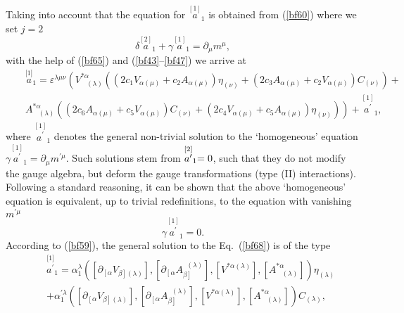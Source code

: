 \documentclass[a4paper,11pt]{article}
\begin{document}
Taking into account that the equation for $\stackrel{[1]}{a}_{1}$ is
obtained from (\ref{bf60}) where we set $j=2$%
\begin{equation}
\delta \stackrel{[2]}{a}_{1}+\gamma \stackrel{[1]}{a}_{1}=\partial _{\mu
}m^{\mu },  \label{bf66}
\end{equation}
with the help of (\ref{bf65}) and (\ref{bf43}--\ref{bf47}) we arrive at
\begin{eqnarray}
&&\stackrel{\lbrack 1]}{a}_{1}=\varepsilon ^{\lambda \mu \nu }\left(
V_{\;\;\;(\lambda )}^{*\alpha }\left( \left( 2c_{1}V_{\alpha (\mu
)}+c_{2}A_{\alpha (\mu )}\right) \eta _{(\nu )}+\left( 2c_{3}A_{\alpha (\mu
)}+c_{2}V_{\alpha (\mu )}\right) C_{(\nu )}\right) +\right.  \nonumber \\
&&\left. A_{\;\;\;(\lambda )}^{*\alpha }\left( \left( 2c_{6}A_{\alpha (\mu
)}+c_{5}V_{\alpha (\mu )}\right) C_{(\nu )}+\left( 2c_{4}V_{\alpha (\mu
)}+c_{5}A_{\alpha (\mu )}\right) \eta _{(\nu )}\right) \right) +\stackrel{[1]%
}{a^{\prime }}_{1},  \label{bf67}
\end{eqnarray}
where $\stackrel{[1]}{a^{\prime }}_{1}$ denotes the general non-trivial
solution to the `homogeneous' equation $\gamma \stackrel{[1]}{a^{\prime }}%
_{1}=\partial _{\mu }m^{\prime \mu }$. Such solutions stem from $\stackrel{%
[2]}{a^{\prime }}_{1}=0$, such that they do not modify the gauge algebra,
but deform the gauge transformations (type (II) interactions). Following a
standard reasoning, it can be shown that the above `homogeneous' equation is
equivalent, up to trivial redefinitions, to the equation with vanishing $%
m^{\prime \mu }$%
\begin{equation}
\gamma \stackrel{[1]}{a^{\prime }}_{1}=0.  \label{bf68}
\end{equation}
According to (\ref{bf59}), the general solution to the Eq.~(\ref{bf68}) is
of the type
\begin{eqnarray}
&&\stackrel{\lbrack 1]}{a^{\prime }}_{1}=\alpha _{1}^{\lambda }\left( \left[
\partial _{\left[ \alpha \right. }V_{\left. \beta \right] (\lambda )}\right]
,\left[ \partial _{\left[ \alpha \right. }A_{\left. \beta \right]
}^{\;\;(\lambda )}\right] ,\left[ V^{*\alpha (\lambda )}\right] ,\left[
A_{\;\;\;(\lambda )}^{*\alpha }\right] \right) \eta _{(\lambda )}  \nonumber
\\
&&+\alpha _{1}^{\prime \lambda }\left( \left[ \partial _{\left[ \alpha
\right. }V_{\left. \beta \right] (\lambda )}\right] ,\left[ \partial
_{\left[ \alpha \right. }A_{\left. \beta \right] }^{\;\;(\lambda )}\right]
,\left[ V^{*\alpha (\lambda )}\right] ,\left[ A_{\;\;\;(\lambda )}^{*\alpha
}\right] \right) C_{(\lambda )},  \label{bf69}
\end{eqnarray}
\end{document}
